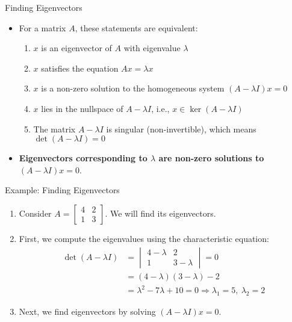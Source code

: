 \begin{frame}{Finding Eigenvectors}
\begin{itemize}
    \item For a matrix \( A \), these statements are equivalent:
    \begin{enumerate}
        \item \( x \) is an eigenvector of \( A \) with eigenvalue \( \lambda \)
        \item \( x \) satisfies the equation \( Ax = \lambda x \)
        \item \( x \) is a non-zero solution to the homogeneous system \( (A - \lambda I)x = 0 \)
        \item $x $ lies in the nullspace of $A-\lambda I$, i.e., $x \in \ker (A-\lambda I)$
        \item The matrix \( A - \lambda I \) is singular (non-invertible), which means \( \det(A - \lambda I) = 0 \)
    \end{enumerate}
    \item \textbf{Eigenvectors corresponding to $\lambda$ are non-zero solutions to $(A-\lambda I)x=0$}.
\end{itemize}
\end{frame}
\begin{frame}{Example: Finding Eigenvectors}
\begin{enumerate}
    \item Consider $A = \begin{bmatrix} 4 & 2 \\ 1 & 3 \end{bmatrix}$. We will find its eigenvectors.
    \item First, we compute the eigenvalues using the characteristic equation:
\begin{align}
\det(A - \lambda I) & = \begin{vmatrix} 4 - \lambda & 2 \\ 1 & 3 - \lambda \end{vmatrix} = 0\\
& = (4 - \lambda)(3 - \lambda) - 2 \\
& = \lambda^2 - 7\lambda + 10 = 0
\Longrightarrow \lambda_1 = 5,\ \lambda_2 = 2
\end{align}
\item Next, we find eigenvectors by solving \( (A - \lambda I)x = 0 \).
\end{enumerate}
\end{frame}
